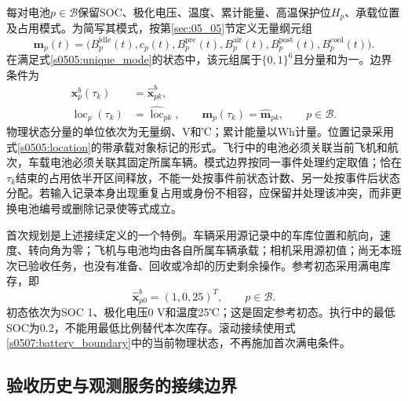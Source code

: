 每对电池$p\in\mathcal B$保留SOC、极化电压、温度、累计能量、高温保护位$H_p$、承载位置及占用模式。为简写其模式，按第\ref{sec:05_05}节定义无量纲元组
\begin{equation}
 \mathbf m_p(t)=
 \bigl(B_p^{\mathrm{idle}}(t),c_p(t),
 B_p^{\mathrm{pre}}(t),B_p^{\mathrm{air}}(t),
 B_p^{\mathrm{post}}(t),B_p^{\mathrm{cool}}(t)\bigr).
 \label{s0507:battery_mode_tuple}
\end{equation}
在满足式\eqref{s0505:unique_mode}的状态中，该元组属于$\{0,1\}^6$且分量和为一。边界条件为
\begin{equation}
 \begin{aligned}
 \mathbf x_p^b(\tau_k)&=\widehat{\mathbf x}_{pk}^b,\\
 \operatorname{loc}_p(\tau_k)&=\widehat{\operatorname{loc}}_{pk},\qquad
 \mathbf m_p(\tau_k)=\widehat{\mathbf m}_{pk},
 \qquad p\in\mathcal B.
 \end{aligned}
 \label{s0507:battery_boundary}
\end{equation}
物理状态分量的单位依次为无量纲、V和℃；累计能量以Wh计量。位置记录采用式\eqref{s0505:location}的带承载对象标记的形式。飞行中的电池必须关联当前飞机和航次，车载电池必须关联其固定所属车辆。模式边界按同一事件处理约定取值；恰在$\tau_k$结束的占用依半开区间释放，不能一处按事件前状态计数、另一处按事件后状态分配。若输入记录本身出现重复占用或身份不相容，应保留并处理该冲突，而非更换电池编号或删除记录使等式成立。

首次规划是上述接续定义的一个特例。车辆采用源记录中的车库位置和航向，速度、转向角为零；飞机与电池均由各自所属车辆承载；相机采用源初值；尚无本班次已验收任务，也没有准备、回收或冷却的历史剩余操作。参考初态采用满电库存，即
\begin{equation}
 \widehat{\mathbf x}_{p0}^b=(1,0,25)^T,\qquad p\in\mathcal B.
 \label{s0507:first_energy}
\end{equation}
初态依次为SOC 1、极化电压0 V和温度25℃；这是固定参考初态。执行中的最低SOC为0.2，不能用最低比例替代本次库存。滚动接续使用式\eqref{s0507:battery_boundary}中的当前物理状态，不再施加首次满电条件。

\subsection{验收历史与观测服务的接续边界}

